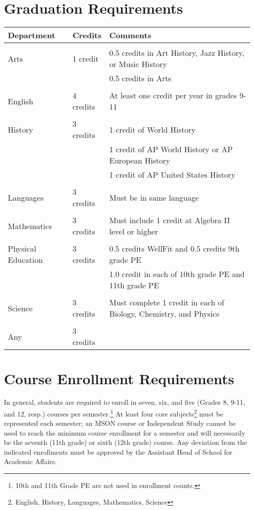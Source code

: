 \etc

\vfill


\section{Graduation Requirements}

\begin{tabular}{lll}
  Department & Credits & Comments\\
  \hline  \hline\\
  Arts & 1 credit& 0.5 credits in Art History, Jazz History, or Music History\\
   & & 0.5 credits in Arts\\  
   \\
  English &  4 credits& At least one credit per year in grades 9-11  \\
  \\
  History      &  3 credits&  1 credit of World History\\
              &  &  1 credit of AP World History or AP European History\\  
              &  &  1 credit of AP United States History\\       
   \\                              
  Languages  &  3 credits& Must be in same language  \\
  \\
  Mathematics   &  3 credits& Must include 1 credit at Algebra II level or higher  \\
  \\
  Physical Education   &  3 credits& 0.5 credits WellFit and 0.5 credits 9th grade PE\\
&&  1.0 credit in each of 10th grade PE and 11th grade PE  \\
\\
  Science                    &  3 credits & Must complete 1 credit in each of Biology, Chemistry, and Physics \\
  \\
  Any                        &  3 credits\\
\end{tabular}


\section{Course Enrollment Requirements}

In general, students are required to enroll in seven, six, and five (Grades 8, 9-11, and 12, resp.) courses per semester.\footnote{10th and 11th Grade PE are not used in enrollment counts.}  At least four core subjects\footnote{English, History, Languages, Mathematics, Science}  must be represented each semester; an MSON course or Independent Study cannot be used to reach the minimum course enrollment for a semester and will necessarily be the seventh (11th grade) or sixth (12th grade) course.  Any deviation from the indicated enrollments must be approved by the Assistant Head of School for Academic Affairs.

